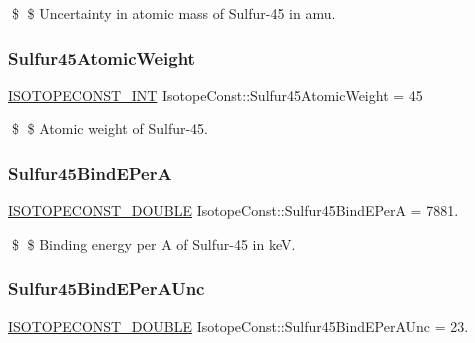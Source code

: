 \$ \$ Uncertainty in atomic mass of Sulfur-\/45 in amu. \mbox{\label{group___isotope_const-_sulfur-_s45_gace5ed53c53f0bf01d94e13ef1f7ed79e}} 
\subsubsection{\texorpdfstring{Sulfur45\+Atomic\+Weight}{Sulfur45AtomicWeight}}
{\footnotesize\ttfamily \mbox{\hyperlink{group___isotope_const-_macros_ga5f18360b3e99483a35c32d789e62621c}{I\+S\+O\+T\+O\+P\+E\+C\+O\+N\+S\+T\+\_\+\+I\+NT}} Isotope\+Const\+::\+Sulfur45\+Atomic\+Weight = 45}

\$ \$ Atomic weight of Sulfur-\/45. \mbox{\label{group___isotope_const-_sulfur-_s45_ga8e0d3fad066b5bb413c5a08b0ea59d01}} 
\subsubsection{\texorpdfstring{Sulfur45\+Bind\+E\+PerA}{Sulfur45BindEPerA}}
{\footnotesize\ttfamily \mbox{\hyperlink{group___isotope_const-_macros_ga8f45a7272ce02c0b4c65c44636ed719a}{I\+S\+O\+T\+O\+P\+E\+C\+O\+N\+S\+T\+\_\+\+D\+O\+U\+B\+LE}} Isotope\+Const\+::\+Sulfur45\+Bind\+E\+PerA = 7881.}

\$ \$ Binding energy per A of Sulfur-\/45 in keV. \mbox{\label{group___isotope_const-_sulfur-_s45_ga55db7854a2fa9baa2e75fc352c8cb81c}} 
\subsubsection{\texorpdfstring{Sulfur45\+Bind\+E\+Per\+A\+Unc}{Sulfur45BindEPerAUnc}}
{\footnotesize\ttfamily \mbox{\hyperlink{group___isotope_const-_macros_ga8f45a7272ce02c0b4c65c44636ed719a}{I\+S\+O\+T\+O\+P\+E\+C\+O\+N\+S\+T\+\_\+\+D\+O\+U\+B\+LE}} Isotope\+Const\+::\+Sulfur45\+Bind\+E\+Per\+A\+Unc = 23.}

